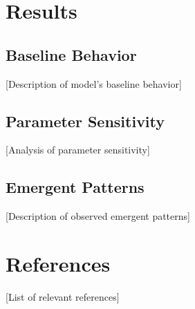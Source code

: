 \documentclass[12pt]{article}
\begin{document}
\section{Results}
\subsection{Baseline Behavior}
[Description of model's baseline behavior]

\subsection{Parameter Sensitivity}
[Analysis of parameter sensitivity]

\subsection{Emergent Patterns}
[Description of observed emergent patterns]

\section{References}
[List of relevant references]
\end{document}
